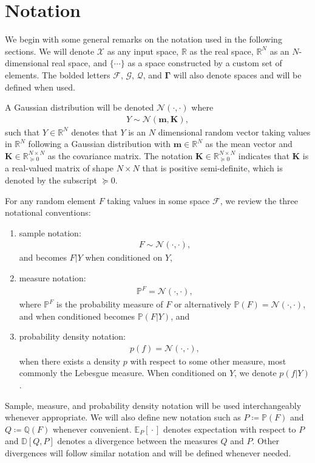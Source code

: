 \documentclass{article}
\newcommand{\wc}{\operatorname{{}\cdot{}}}
\numberwithin{equation}{section}
\begin{document}
\section{Notation}
We begin with some general remarks on the notation used in the following sections. 
We will denote $\mathcal{X}$ as any input space, $\mathbb{R}$ as the real space, $\mathbb{R}^N$ as an $N$-dimensional real space, and $\{\cdots\}$ as a space constructed by a custom set of elements. The bolded letters $\boldsymbol{\boldsymbol{\mathcal{F}}}$, $\boldsymbol{\mathcal{G}}$, $\boldsymbol{\mathcal{Q}}$, and $\boldsymbol{\Gamma}$ will also denote spaces and will be defined when used.

A Gaussian distribution will be denoted $\mathcal{N}(\cdot, \cdot)$ where 
\begin{align}
    Y \sim \mathcal{N}(\mathbf{m}, \mathbf{K}),
\end{align}
such that $Y \in \mathbb{R}^N$ denotes that $Y$ is an $N$ dimensional random vector taking values in $\mathbb{R}^N$ following a Gaussian distribution with $\mathbf{m} \in \mathbb{R}^N$ as the mean vector and $\mathbf{K} \in \mathbb{R}^{N \times N}_{\succcurlyeq 0}$ as the covariance matrix. 
The notation $\mathbf{K} \in \mathbb{R}^{N \times N}_{\succcurlyeq 0}$ indicates that $\mathbf{K}$ is a real-valued matrix of shape $N \times N$ that is positive semi-definite, which is denoted by the subscript ${\succcurlyeq 0}$. 


For any random element $F$ taking values in some space $\boldsymbol{\boldsymbol{\mathcal{F}}}$, we review the three notational conventions:
\begin{enumerate}
    \item sample notation: 
        \begin{align}
            F \sim \mathcal{N}(\cdot, \cdot),
        \end{align}
        and becomes $F \vert Y$ when conditioned on $Y$,
    \item measure notation: 
        \begin{align}
            \mathbb{P}^F = \mathcal{N}(\cdot, \cdot),
        \end{align}
        where $\mathbb{P}^F$ is the probability measure of $F$ or alternatively $\mathbb{P}(F) = \mathcal{N}(\cdot, \cdot)$, and when conditioned becomes $\mathbb{P}(F \vert Y)$, and
    \item probability density notation: 
        \begin{align}
           p(f) = \mathcal{N}(\cdot, \cdot),
        \end{align}
        when there exists a density $p$ with respect to some other measure, most commonly the Lebesgue measure. When conditioned on $Y$, we denote $p(f\vert Y)$.
\end{enumerate}
Sample, measure, and probability density notation will be used interchangeably whenever appropriate. We will also define new notation such as $P \coloneqq \mathbb{P}(F)$ and $Q \coloneqq \mathbb{Q}(F)$ whenever convenient. $\mathbb{E}_{P}[\wc]$ denotes expectation with respect to $P$ and $\mathbb{D}[Q, P]$ denotes a divergence between the measures $Q$ and $P$. Other divergences will follow similar notation and will be defined whenever needed.
\end{document}
